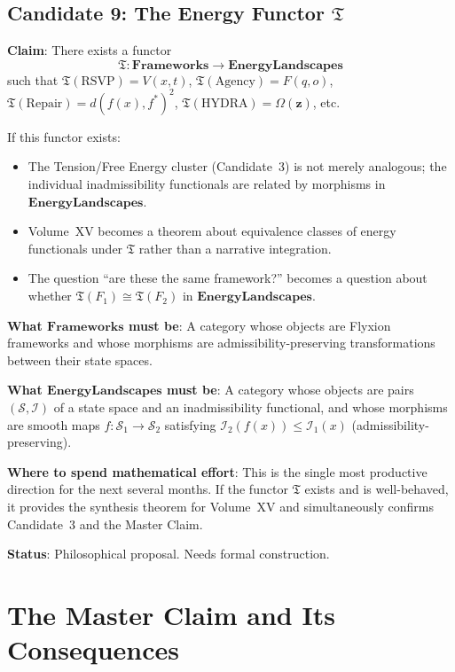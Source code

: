 \documentclass[11pt, a4paper]{article}
\begin{document}
\subsection{Candidate 9: The Energy Functor $\mathfrak{T}$}

\begin{candbox}
\textbf{Claim}: There exists a functor
\[
  \mathfrak{T}: \mathbf{Frameworks} \to \mathbf{EnergyLandscapes}
\]
such that $\mathfrak{T}(\text{RSVP}) = V(x,t)$,
$\mathfrak{T}(\text{Agency}) = F(q,o)$,
$\mathfrak{T}(\text{Repair}) = d(f(x),f^*)^2$,
$\mathfrak{T}(\text{HYDRA}) = \Omega(\mathbf{z})$, etc.

\medskip
If this functor exists:
\begin{itemize}
\item The Tension/Free Energy cluster (Candidate~3) is not merely
  analogous; the individual inadmissibility functionals are related
  by morphisms in $\mathbf{EnergyLandscapes}$.
\item Volume~XV becomes a theorem about equivalence classes of energy
  functionals under $\mathfrak{T}$ rather than a narrative integration.
\item The question ``are these the same framework?'' becomes a question
  about whether $\mathfrak{T}(F_1) \cong \mathfrak{T}(F_2)$ in
  $\mathbf{EnergyLandscapes}$.
\end{itemize}

\medskip
\textbf{What $\mathbf{Frameworks}$ must be}: A category whose objects
are Flyxion frameworks and whose morphisms are admissibility-preserving
transformations between their state spaces.

\medskip
\textbf{What $\mathbf{EnergyLandscapes}$ must be}: A category whose
objects are pairs $(\mathcal{S}, \mathcal{I})$ of a state space and
an inadmissibility functional, and whose morphisms are smooth maps
$f: \mathcal{S}_1 \to \mathcal{S}_2$ satisfying
$\mathcal{I}_2(f(x)) \leq \mathcal{I}_1(x)$ (admissibility-preserving).

\medskip
\textbf{Where to spend mathematical effort}: This is the single most
productive direction for the next several months. If the functor
$\mathfrak{T}$ exists and is well-behaved, it provides the synthesis
theorem for Volume~XV and simultaneously confirms Candidate~3 and
the Master Claim.

\medskip
\textbf{Status}: Philosophical proposal. Needs formal construction.
\end{candbox}
\section{The Master Claim and Its Consequences}
\end{document}
